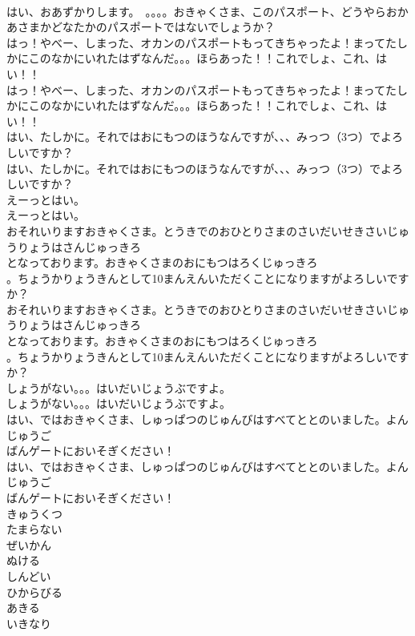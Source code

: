 \documentclass[8pt]{extreport}
\begin{document}
\begin{CJK}{UTF8}{min}
\\	はい、おあずかりします。　。。。。おきゃくさま、このパスポート、どうやらおかあさまかどなたかのパスポートではないでしょうか？
\\	はっ！やべー、しまった、オカンのパスポートもってきちゃったよ！まってたしかにこのなかにいれたはずなんだ。。。ほらあった！！これでしょ、これ、はい！！
\\	はっ！やべー、しまった、オカンのパスポートもってきちゃったよ！まってたしかにこのなかにいれたはずなんだ。。。ほらあった！！これでしょ、これ、はい！！
\\	はい、たしかに。それではおにもつのほうなんですが、、、みっつ（3つ）でよろしいですか？
\\	はい、たしかに。それではおにもつのほうなんですが、、、みっつ（3つ）でよろしいですか？
\\	えーっとはい。
\\	えーっとはい。
\\	おそれいりますおきゃくさま。とうきでのおひとりさまのさいだいせきさいじゅうりょうはさんじゅっきろ
\\	となっております。おきゃくさまのおにもつはろくじゅっきろ
\\	。ちょうかりょうきんとして10まんえんいただくことになりますがよろしいですか？
\\	おそれいりますおきゃくさま。とうきでのおひとりさまのさいだいせきさいじゅうりょうはさんじゅっきろ
\\	となっております。おきゃくさまのおにもつはろくじゅっきろ
\\	。ちょうかりょうきんとして10まんえんいただくことになりますがよろしいですか？
\\	しょうがない。。。はいだいじょうぶですよ。
\\	しょうがない。。。はいだいじょうぶですよ。
\\	はい、ではおきゃくさま、しゅっぱつのじゅんびはすべてととのいました。よんじゅうご
\\	ばんゲートにおいそぎください！
\\	はい、ではおきゃくさま、しゅっぱつのじゅんびはすべてととのいました。よんじゅうご
\\	ばんゲートにおいそぎください！
\\	きゅうくつ
\\	たまらない
\\	ぜいかん
\\	ぬける
\\	しんどい
\\	ひからびる
\\	あきる
\\	いきなり

\end{CJK}
\end{document}
